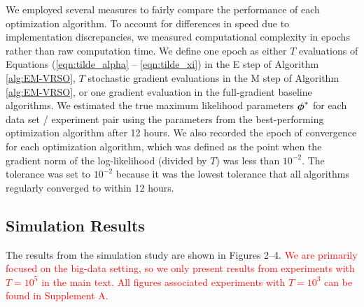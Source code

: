 We employed several measures to fairly compare the performance of each optimization algorithm. To account for differences in speed due to implementation discrepancies, we measured computational complexity in epochs rather than raw computation time. We define one epoch as either $T$ evaluations of Equations (\ref{eqn:tilde_alpha} -- \ref{eqn:tilde_xi}) in the E step of Algorithm \ref{alg:EM-VRSO}, $T$ stochastic gradient evaluations in the M step of Algorithm \ref{alg:EM-VRSO}, or one gradient evaluation in the full-gradient baseline algorithms. We estimated the true maximum likelihood parameters $\boldsymbol{\phi}^*$ for each data set / experiment pair using the parameters from the best-performing optimization algorithm after 12 hours. We also recorded the epoch of convergence for each optimization algorithm, which was defined as the point when the gradient norm of the log-likelihood (divided by $T$) was less than $10^{-2}$. The tolerance was set to $10^{-2}$ because it was the lowest tolerance that all algorithms regularly converged to within 12 hours.

\subsection{Simulation Results}

The results from the simulation study are shown in Figures 2--4. \textcolor{red}{We are primarily focused on the big-data setting, so we only present results from experiments with $T = 10^5$ in the main text. All figures associated experiments with $T=10^3$ can be found in Supplement A.}

